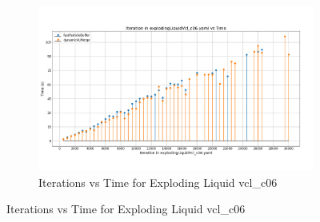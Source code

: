 \begin{figure}[H]\ContinuedFloat
\centering
\begin{subfigure}{\linewidth}
    \centering
    \includegraphics[width=\linewidth]{graphs/explodingLiquid/normalExperiments/iter/vclc06.png}
    \caption{Iterations vs Time for Exploding Liquid vcl\_c06}
    \label{fig:constantVelocityCube}
\end{subfigure}
\end{figure}

